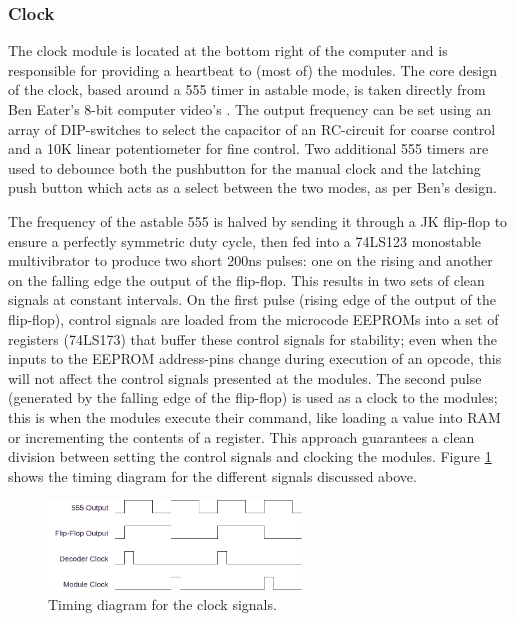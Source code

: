 \subsubsection{Clock}
The clock module is located at the bottom right of the computer and is responsible for providing a heartbeat to (most of) the modules. The core design of the clock, based around a 555 timer in astable mode, is taken directly from Ben Eater's 8-bit computer video's \cite{beneater}. The output frequency can be set using an array of DIP-switches to select the capacitor of an RC-circuit for coarse control and a 10K linear potentiometer for fine control. Two additional 555 timers are used to debounce both the pushbutton for the manual clock and the latching push button which acts as a select between the two modes, as per Ben's design. 

The frequency of the astable 555 is halved by sending it through a JK flip-flop to ensure a perfectly symmetric duty cycle, then fed into a 74LS123 monostable multivibrator to produce two short 200ns pulses: one on the rising and another on the falling edge the output of the flip-flop. This results in two sets of clean signals at constant intervals. On the first pulse (rising edge of the output of the flip-flop), control signals are loaded from the microcode EEPROMs into a set of registers (74LS173) that buffer these control signals for stability; even when the inputs to the EEPROM address-pins change during execution of an opcode, this will not affect the control signals presented at the modules. The second pulse (generated by the falling edge of the flip-flop) is used as a clock to the modules; this is when the modules execute their command, like loading a value into RAM or incrementing the contents of a register. This approach guarantees a clean division between setting the control signals and clocking the modules. Figure \ref{fig:clocktiming} shows the timing diagram for the different signals discussed above.

\begin{figure}[H]
  \centering
  \includegraphics[width=0.6\textwidth]{img/clocktiming}
  \caption{Timing diagram for the clock signals.}
  \label{fig:clocktiming}
\end{figure}

